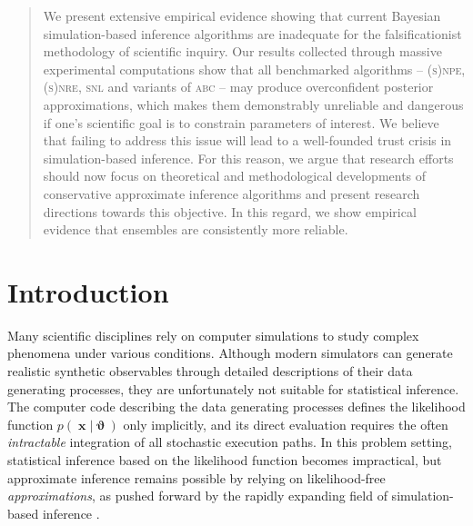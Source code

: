 \documentclass[twoside]{article}
\DeclareMathOperator{\vtheta}{\boldsymbol\vartheta}
\DeclareMathOperator{\vx}{\boldsymbol x}
\begin{document}
\begin{abstract}
We present extensive empirical evidence showing that current Bayesian simulation-based inference algorithms are inadequate for the falsificationist methodology of scientific inquiry.
Our results collected through massive experimental computations show that all benchmarked algorithms -- \textsc{(s)npe}, \textsc{(s)nre}, \textsc{snl} and variants of \textsc{abc} -- may produce overconfident posterior approximations, which makes them demonstrably unreliable and dangerous if one's scientific goal is to constrain parameters of interest. %
We believe that failing to address this issue will lead to a well-founded trust crisis in simulation-based inference.
For this reason, we argue that research efforts should now focus on theoretical and methodological developments of conservative approximate inference algorithms and present research directions towards this objective.
In this regard, we show empirical evidence that ensembles are consistently more reliable.

\end{abstract}

\section{Introduction}

Many scientific disciplines rely on computer simulations to study complex phenomena under various conditions.
Although modern simulators can generate realistic synthetic observables through detailed descriptions of their data generating processes, they are unfortunately not suitable for statistical inference.
The computer code describing the data generating processes defines the likelihood function $p(\vx\vert\vtheta)$ only implicitly, and its direct evaluation requires the often \emph{intractable} integration of all stochastic execution paths.
In this problem setting, statistical inference based on the likelihood function becomes impractical, but approximate inference remains possible by relying on likelihood-free \emph{approximations}, as pushed forward by the rapidly expanding field of simulation-based inference \citep{cranmer2020frontier}.
\end{document}

